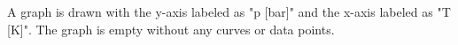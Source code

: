 A graph is drawn with the y-axis labeled as "p [bar]" and the x-axis labeled as "T [K]". The graph is empty without any curves or data points.
